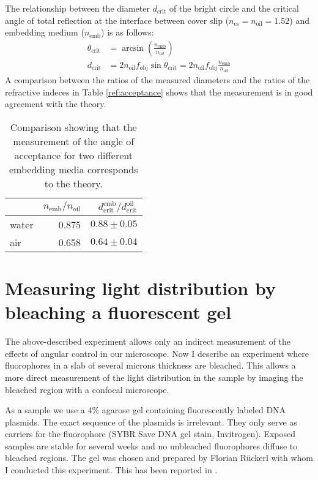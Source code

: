 The relationship between the diameter $d_\textrm{crit}$ of the bright
circle and the critical angle of total reflection at the interface
between cover slip ($n_\textrm{cs}=n_\textrm{oil}=1.52$) and embedding
medium ($n_\textrm{emb}$) is as follows:
\begin{align}
  \theta_\textrm{crit}&=\arcsin\left(\frac{n_\textrm{emb}}{n_{oil}}\right) \\
  d_\textrm{crit} &= 2 n_\textrm{oil} f_\textrm{obj}
  \sin\theta_\textrm{crit}= 2 n_\textrm{oil} f_\textrm{obj}
  \frac{n_\textrm{emb}}{n_{oil}}
\end{align}
A comparison between the ratios of the measured diameters and the
ratios of the refractive indeces in Table \ref{ref:acceptance} shows
that the measurement is in good agreement with the theory.
\begin{table}[!hbt]
  \centering
  \begin{tabular}{ l r r }
\toprule
    & $n_\textrm{emb}/n_\textrm{oil}$ & $d^\textrm{emb}_\textrm{crit}/ d^\textrm{oil}_\textrm{crit}$ \\  \midrule
    water & 0.875 & $0.88\pm0.05$ \\
    air & 0.658 & $0.64\pm0.04$ \\
\bottomrule
  \end{tabular}
  \caption{Comparison showing that the measurement of the angle of acceptance for two different embedding media corresponds to the theory.}
  \label{tab:acceptance}
\end{table}


\section{Measuring light distribution by bleaching a fluorescent gel}
The above-described experiment allows only an indirect measurement of the
effects of angular control in our microscope. Now I describe an
experiment where fluorophores in a slab of several microns thickness
are bleached. This allows a more direct measurement of the light
distribution in the sample by imaging the bleached region with a
confocal microscope.

As a sample we use a 4\% agarose gel containing fluorescently labeled
DNA plasmids. The exact sequence of the plasmids is irrelevant. They
only serve as carriers for the fluorophore (SYBR Save DNA gel stain,
Invitrogen). Exposed samples are stable for several weeks and no
unbleached fluorophores diffuse to bleached regions. The gel was
chosen and prepared by Florian R\"uckerl with whom I conducted this
experiment. This has been reported in \cite{Ruckerl}.


